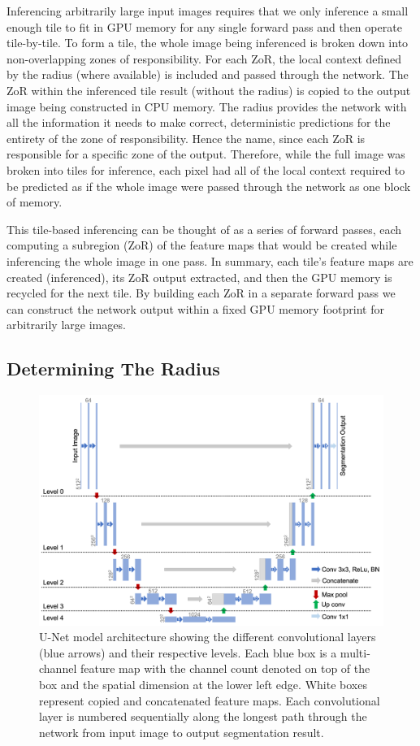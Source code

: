 \documentclass[letterpaper]{article} %
\begin{document}
Inferencing arbitrarily large input images requires that we only inference a small enough tile to fit in GPU memory for any single forward pass and then operate tile-by-tile. To form a tile, the whole image being inferenced is broken down into non-overlapping zones of responsibility. For each ZoR, the local context defined by the radius (where available) is included and passed through the network. The ZoR within the inferenced tile result (without the radius) is copied to the output image being constructed in CPU memory. The radius provides the network with all the information it needs to make correct, deterministic predictions for the entirety of the zone of responsibility. Hence the name, since each ZoR is responsible for a specific zone of the output. Therefore, while the full image was broken into tiles for inference, each pixel had all of the local context required to be predicted as if the whole image were passed through the network as one block of memory. 

This tile-based inferencing can be thought of as a series of forward passes, each computing a subregion (ZoR) of the feature maps that would be created while inferencing the whole image in one pass. In summary, each tile's feature maps are created (inferenced), its ZoR output extracted, and then the GPU memory is recycled for the next tile. By building each ZoR in a separate forward pass we can construct the network output within a fixed GPU memory footprint for arbitrarily large images. 


\subsection{Determining The Radius}

\begin{figure}[h!]
	\centering
		\includegraphics[width=\linewidth]{figs/unet-levels.png}
	\caption{U-Net model architecture showing the different convolutional layers (blue arrows) and their respective levels. Each blue box is a multi-channel feature map with the channel count denoted on top of the box and the spatial dimension at the lower left edge. White boxes represent copied and concatenated feature maps. Each convolutional layer is numbered sequentially along the longest path through the network from input image to output segmentation result.}
	\label{fig:unet-levels}
\end{figure}
\end{document}
